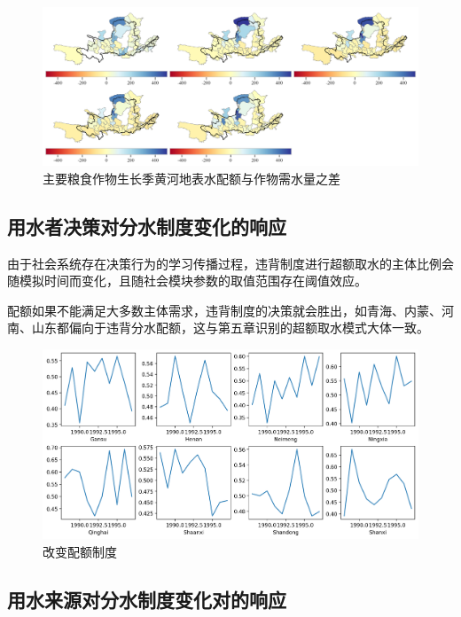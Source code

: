 \begin{figure}[htb]
    \centering
    \includegraphics[width=\textwidth]{img/ch6/ch6_deficits_map.png}
    \caption{主要粮食作物生长季黄河地表水配额与作物需水量之差}\label{ch6:fig:deficits_maps}
\end{figure}

\subsection{用水者决策对分水制度变化的响应}

由于社会系统存在决策行为的学习传播过程，违背制度进行超额取水的主体比例会随模拟时间而变化，且随社会模块参数的取值范围存在阈值效应。

配额如果不能满足大多数主体需求，违背制度的决策就会胜出，如青海、内蒙、河南、山东都偏向于违背分水配额，这与第五章识别的超额取水模式大体一致。

\begin{figure}[htb]
    \centering
    \includegraphics[width=\textwidth]{img/ch6/ch6_threshold.png}
    \caption{改变配额制度}\label{fig:xfig0}
\end{figure}

\subsection{用水来源对分水制度变化对的响应}

